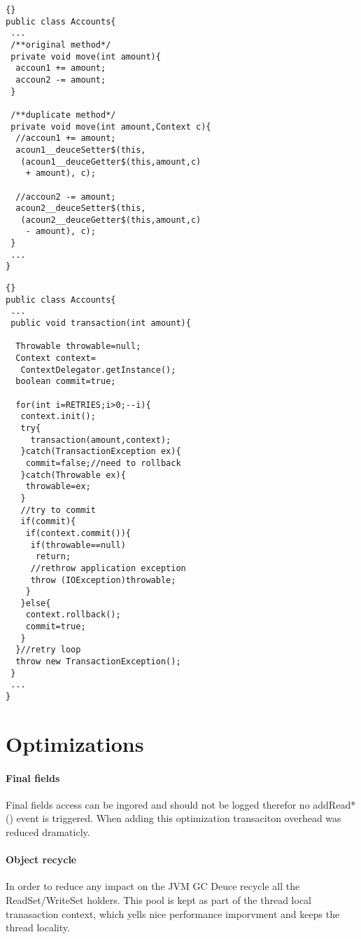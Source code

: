 \documentclass[preprint,natbib,10pt]{sigplanconf}
\begin{document}
\lstset{language=java}
\lstset{commentstyle=\textit}
\begin{lstlisting}[frame=trbl,caption=Fields accessors,label=lst:duplicate_method]{}
public class Accounts{
 ...
 /**original method*/
 private void move(int amount){
  accoun1 += amount;
  accoun2 -= amount;
 }

 /**duplicate method*/
 private void move(int amount,Context c){
  //accoun1 += amount;
  acoun1__deuceSetter$(this,
   (acoun1__deuceGetter$(this,amount,c) 
    + amount), c);

  //accoun2 -= amount;
  acoun2__deuceSetter$(this,
   (acoun2__deuceGetter$(this,amount,c) 
    - amount), c);
 }
 ...
}
\end{lstlisting}


\lstset{language=java}
\lstset{commentstyle=\textit}
\begin{lstlisting}[frame=trbl,caption=Fields accessors,label=lst:atomic_method]{}
public class Accounts{
 ...
 public void transaction(int amount){

  Throwable throwable=null;
  Context context=
   ContextDelegator.getInstance();
  boolean commit=true;

  for(int i=RETRIES;i>0;--i){
   context.init();
   try{
     transaction(amount,context);
   }catch(TransactionException ex){
    commit=false;//need to rollback
   }catch(Throwable ex){
    throwable=ex;
   }
   //try to commit
   if(commit){
    if(context.commit()){
     if(throwable==null)
      return;
     //rethrow application exception
     throw (IOException)throwable;
    }
   }else{
    context.rollback(); 
    commit=true;
   }
  }//retry loop
  throw new TransactionException();
 }
 ...
} 
\end{lstlisting}

\section{Optimizations}
\paragraph{Final fields} Final fields access can be ingored and should not be logged therefor no addRead*() event is triggered. When adding this optimization transaciton overhead was reduced dramaticly. 
\paragraph{Object recycle} In order to reduce any impact on the JVM GC Deuce recycle all the ReadSet/WriteSet holders. This pool is kept as part of the thread local tranasaction context, which yells nice performance imporvment and keeps the thread locality.
\end{document}
